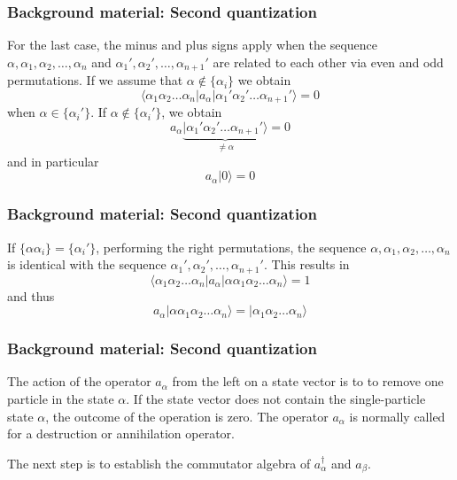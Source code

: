\documentclass[compress]{beamer}
\newcommand*{\ket}[1]{|#1\rangle}
\newcommand*{\bra}[1]{\langle#1|}
\newcommand{\element}[3]
        {\bra{#1}#2\ket{#3}}
\begin{document}
\frame
{
  \frametitle{Background material: Second quantization}
\begin{small}
{\scriptsize
For the last case, the minus and plus signs apply when the sequence 
$\alpha ,\alpha_1, \alpha_2, \dots, \alpha_n$ and 
$\alpha_1', \alpha_2', \dots, \alpha_{n+1}'$ are related to each other via even and odd permutations.
If we assume that  $\alpha \notin \{\alpha_i\}$ we obtain 
\begin{equation}
	\element{\alpha_1\alpha_2 \dots \alpha_n}{a_\alpha}{\alpha_1'\alpha_2' \dots \alpha_{n+1}'} = 0 \label{eq:2-12}
\end{equation}
when $\alpha \in \{\alpha_i'\}$. If $\alpha \notin \{\alpha_i'\}$, we obtain
\begin{equation}
	a_\alpha\underbrace{\ket{\alpha_1'\alpha_2' \dots \alpha_{n+1}'}}_{\neq \alpha} = 0 \label{eq:2-13a}
\end{equation}
and in particular
\begin{equation}
	a_\alpha \ket{0} = 0 \label{eq:2-13b}
\end{equation}
}
\end{small}
}

\frame
{
  \frametitle{Background material: Second quantization}
\begin{small}
{\scriptsize
If $\{\alpha\alpha_i\} = \{\alpha_i'\}$, performing the right permutations, the sequence
$\alpha ,\alpha_1, \alpha_2, \dots, \alpha_n$ is identical with the sequence
$\alpha_1', \alpha_2', \dots, \alpha_{n+1}'$. This results in
\begin{equation}
	\element{\alpha_1\alpha_2 \dots \alpha_n}{a_\alpha}{\alpha\alpha_1\alpha_2 \dots \alpha_{n}} = 1 \label{eq:2-14}
\end{equation}
and thus
\begin{equation}
	a_\alpha \ket{\alpha\alpha_1\alpha_2 \dots \alpha_{n}} = \ket{\alpha_1\alpha_2 \dots \alpha_{n}} \label{eq:2-15}
\end{equation}
}
\end{small}
}

\frame
{
  \frametitle{Background material: Second quantization}
\begin{small}
{\scriptsize
The action of the operator 
$a_\alpha$ from the left on a state vector  is to to remove  one particle in the state
$\alpha$. 
If the state vector does not contain the single-particle state $\alpha$, the outcome of the operation is zero.
The operator  $a_\alpha$ is normally called for a destruction or annihilation operator.

The next step is to establish the  commutator algebra of $a_\alpha^\dagger$ and
$a_\beta$. 
}
\end{small}
}
\end{document}
